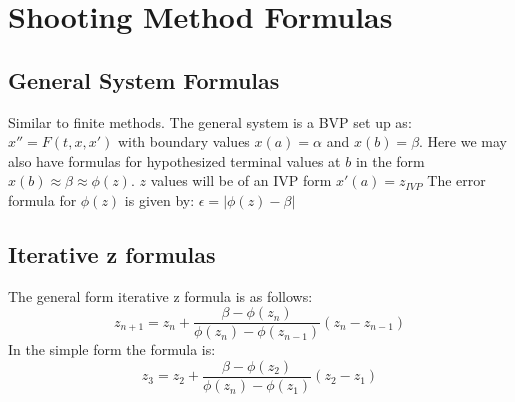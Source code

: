 \section{Shooting Method Formulas}

\subsection*{General System Formulas}
Similar to finite methods.
The general system is a BVP set up as:
$ x'' = F(t, x, x')$ with boundary values $x(a) = \alpha$ and $x(b) = \beta$.
Here we may also have formulas for hypothesized terminal values at $b$ in
the form $x(b) \approx \beta \approx \phi(z)$. $z$ values will be of an IVP form $x'(a) = z_{IVP}$
\newline
The error formula for $\phi(z)$ is given by: $\epsilon = | \phi(z) - \beta |$
\newline
\newline
\subsection*{Iterative z formulas}
The general form iterative z formula is as follows:
\[
z_{n+1} = z_n + \frac{\beta - \phi(z_n)}{\phi(z_n) - \phi(z_{n-1})}(z_n - z_{n-1})
\]
In the simple form the formula is:
\[
z_3 = z_2 + \frac{\beta - \phi(z_2)}{\phi(z_n) - \phi(z_1)}(z_2 - z_1)
\]
